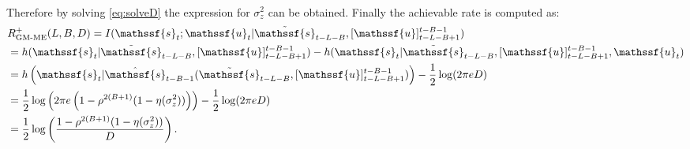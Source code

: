 \documentclass[journal, twocolumn, 10pt]{IEEEtran}
\newcommand{\rvs}{{\mathssf{s}}}    %
\newcommand{\rvu}{{\mathssf{u}}}    %
\begin{document}
{\begin{align}
\end{align} Therefore by solving \eqref{eq:solveD} the expression for $\sigma^{2}_{z}$ can be obtained.  Finally the achievable rate is computed as:
\begin{align}
& R^{+}_{\textrm{GM-ME}}(L,B,D)  = I(\rvs_{t};\rvu_{t} | \tilde{\rvs}_{t-L-B} ,  [\rvu]_{t-L-B+1}^{t-B-1})\notag\\
 &  =  h(\rvs_{t} | \tilde{\rvs}_{t-L-B} ,  [\rvu]_{t-L-B+1}^{t-B-1}) - h(\rvs_{t} | \tilde{\rvs}_{t-L-B} ,  [\rvu]_{t-L-B+1}^{t-B-1}, \rvu_{t})\notag\\
 & = h\left(\rvs_{t} | \hat{\rvs}_{t-B-1}(\tilde{\rvs}_{t-L-B}, [\rvu]_{t-L-B+1}^{t-B-1})\right) - \frac{1}{2} \log( 2 \pi e D)\notag\\
 & = \frac{1}{2} \log\left( 2 \pi e  \left(1-\rho^{2(B+1)}(1-\eta (\sigma^{2}_{z})) \right)\right) - \frac{1}{2} \log( 2 \pi e D)\notag\\
 & = \frac{1}{2} \log\left(\frac{ 1-\rho^{2(B+1)}(1-\eta (\sigma^{2}_{z}))}{D}\right).\label{eq:repD}
\end{align}  

}
\end{document}
